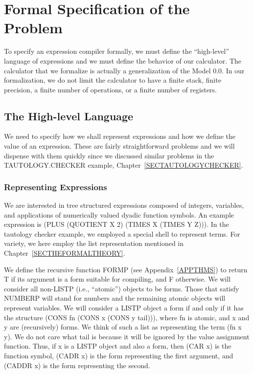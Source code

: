 \documentclass[11pt]{book}
\newcommand{\pubdefaulttextsize}{\large}
\begin{document}
\section{Formal Specification of the Problem}
\pubdefaulttextsize
To specify an expression compiler
formally, we must define the ``high-level'' language
of expressions and we must define the
behavior of our calculator.  The calculator
that we formalize is actually a generalization
of the Model 0.0.  In our formalization, we
do not limit the calculator to have a finite
stack, finite precision, a finite number
of operations, or a finite number of registers.
\subsection{The High-level Language}
\pubdefaulttextsize
We need to specify how we shall represent expressions
and how we define the value of an expression.
These are fairly straightforward problems and we will dispense
with them quickly since we discussed similar problems in the
TAUTOLOGY.CHECKER example, Chapter~\ref{SECTAUTOLOGYCHECKER}.
\subsubsection{Representing Expressions}
\pubdefaulttextsize
We are interested in tree structured 
expressions composed of integers, variables, and
applications of numerically valued dyadic function symbols.
An example expression is (PLUS (QUOTIENT X 2) (TIMES X (TIMES Y Z))).
In the tautology checker example, we employed a special shell to represent
terms.  For variety, we here employ the list representation
mentioned in Chapter~\ref{SECTHEFORMALTHEORY}.

We define the recursive function FORMP (see Appendix~\ref{APPTHMS}) to return T if its
argument is a form suitable for compiling, and F otherwise.
We will consider all non-LISTP (i.e., ``atomic'') objects to be forms.  Those that satisfy NUMBERP
will stand for numbers and the remaining atomic objects will represent variables.
We will consider a LISTP object a form if and only if it has the structure
(CONS fn (CONS x (CONS y tail))), where fn is atomic, and x and y are
(recursively) forms.  We think of such a list as representing the
term (fn x y).  We do not care what tail is because it will be
ignored by the value assignment function.
Thus, if x is a LISTP object and
also a form, then (CAR x) is the function symbol, (CADR x) is the form representing
the first argument, and (CADDR x) is the form representing the second.
\end{document}
